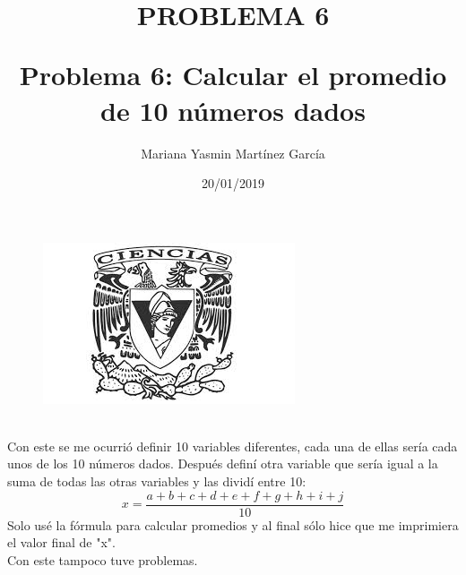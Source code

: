\documentclass{article}
\title{\Huge\item\color{orange}\textbf{PROBLEMA 6 }}
\author{\Large Mariana Yasmin Martínez García}
\date{\Large 20/01/2019}
\begin{document}
\begin{figure}[t]
	\centering
	\includegraphics[width=0.7\linewidth]{../Imagenes/1}
	\caption{}
	\label{figura:1}
\end{figure}


	\maketitle
		
	\newpage
	
	\title{\huge\textbf{Problema 6: Calcular el promedio de 10 números dados }} \\
	Con este se me ocurrió definir 10 variables diferentes, cada una de ellas sería cada unos de los 10 números dados. Después definí otra variable que sería igual a la suma de todas las otras variables y las dividí entre 10:
	\[x = \frac{a+b+c+d+e+f+g+h+i+j}{10}\]
	Solo usé la fórmula para calcular promedios y al final sólo hice que me imprimiera el valor final de "x".\\
	Con este tampoco tuve problemas.
\end{document}
